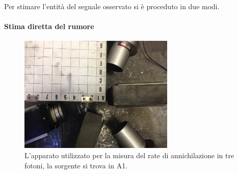 Per stimare l'entità del segnale osservato si è proceduto in due modi.
\paragraph{Stima diretta del rumore}




 \begin{figure}[h]
	\centering
	\includegraphics[width=20em]{immagini/3gamma_foto}
	\caption{\label{fig:3gamma_signal} L'apparato utilizzato per la misura del rate di annichilazione in tre fotoni, la sorgente si trova in A1.}
	\label{fig:foto_3gamma}
\end{figure}

